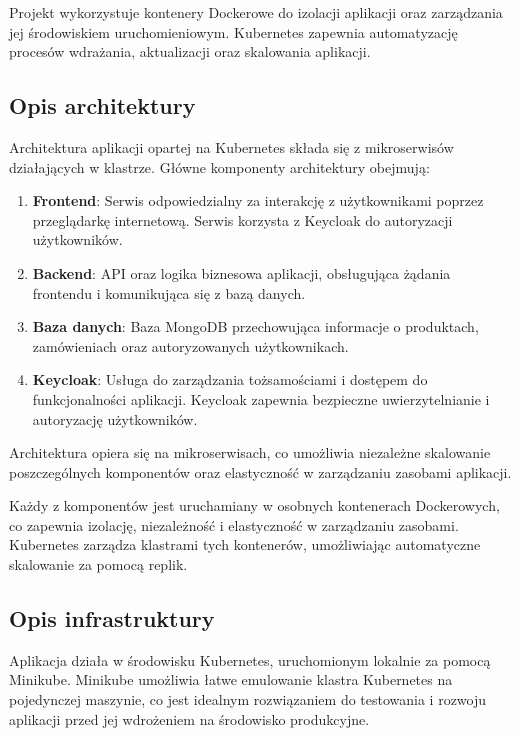 \documentclass[12pt,a4paper]{article}
\begin{document}
Projekt wykorzystuje kontenery Dockerowe do izolacji aplikacji oraz zarządzania jej środowiskiem uruchomieniowym. Kubernetes zapewnia automatyzację procesów wdrażania, aktualizacji oraz skalowania aplikacji.

\subsection{Opis architektury}
\label{sec:introduction}
Architektura aplikacji opartej na Kubernetes składa się z mikroserwisów działających w klastrze. Główne komponenty architektury obejmują:

\begin{enumerate}
  \item\textbf{Frontend}: Serwis odpowiedzialny za interakcję z użytkownikami poprzez przeglądarkę internetową. Serwis korzysta z Keycloak do autoryzacji użytkowników.

  \item\textbf{Backend}: API oraz logika biznesowa aplikacji, obsługująca żądania frontendu i komunikująca się z bazą danych.

  \item\textbf{Baza danych}: Baza MongoDB przechowująca informacje o produktach, zamówieniach oraz autoryzowanych użytkownikach.

  \item\textbf{Keycloak}: Usługa do zarządzania tożsamościami i dostępem do funkcjonalności aplikacji. Keycloak zapewnia bezpieczne uwierzytelnianie i autoryzację użytkowników.
\end{enumerate}

Architektura opiera się na mikroserwisach, co umożliwia niezależne skalowanie poszczególnych komponentów oraz elastyczność w zarządzaniu zasobami aplikacji.

Każdy z komponentów jest uruchamiany w osobnych kontenerach Dockerowych, co zapewnia izolację, niezależność i elastyczność w zarządzaniu zasobami. Kubernetes zarządza klastrami tych kontenerów, umożliwiając automatyczne skalowanie za pomocą replik.

\subsection{Opis infrastruktury}
\label{sec:Users}
Aplikacja działa w środowisku Kubernetes, uruchomionym lokalnie za pomocą Minikube. Minikube umożliwia łatwe emulowanie klastra Kubernetes na pojedynczej maszynie, co jest idealnym rozwiązaniem do testowania i rozwoju aplikacji przed jej wdrożeniem na środowisko produkcyjne. 
\end{document}
